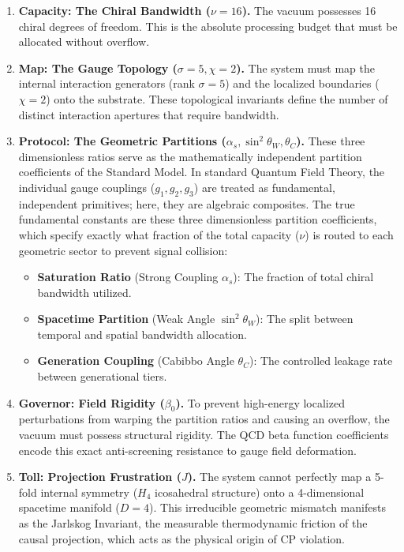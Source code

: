 \begin{enumerate}
    \item \textbf{Capacity: The Chiral Bandwidth ($\nu = 16$).} 
    The vacuum possesses 16 chiral degrees of freedom. This is the absolute processing budget that must be allocated without overflow.
    
    \item \textbf{Map: The Gauge Topology ($\sigma=5, \chi=2$).} 
    The system must map the internal interaction generators (rank $\sigma=5$) and the localized boundaries ($\chi=2$) onto the substrate. These topological invariants define the number of distinct interaction apertures that require bandwidth.
        
    \item \textbf{Protocol: The Geometric Partitions ($\alpha_s, \sin^2\theta_W, \theta_C$).}
    These three dimensionless ratios serve as the mathematically independent partition coefficients of the Standard Model. In standard Quantum Field Theory, the individual gauge couplings ($g_1, g_2, g_3$) are treated as fundamental, independent primitives; here, they are algebraic composites. The true fundamental constants are these three dimensionless partition coefficients, which specify exactly what fraction of the total capacity ($\nu$) is routed to each geometric sector to prevent signal collision:

    \begin{itemize}
        \item \textbf{Saturation Ratio} (Strong Coupling $\alpha_s$): The fraction of total chiral bandwidth utilized.
        \item \textbf{Spacetime Partition} (Weak Angle $\sin^2\theta_W$): The split between temporal and spatial bandwidth allocation.
        \item \textbf{Generation Coupling} (Cabibbo Angle $\theta_C$): The controlled leakage rate between generational tiers.
    \end{itemize}
    
    \item \textbf{Governor: Field Rigidity ($\beta_0$).} 
    To prevent high-energy localized perturbations from warping the partition ratios and causing an overflow, the vacuum must possess structural rigidity. The QCD beta function coefficients encode this exact anti-screening resistance to gauge field deformation.
 
    \item \textbf{Toll: Projection Frustration ($J$).} 
    The system cannot perfectly map a 5-fold internal symmetry ($H_4$ icosahedral structure) onto a 4-dimensional spacetime manifold ($D=4$). This irreducible geometric mismatch manifests as the Jarlskog Invariant, the measurable thermodynamic friction of the causal projection, which acts as the physical origin of CP violation.


\end{enumerate}
